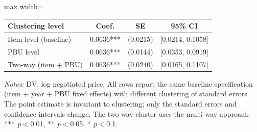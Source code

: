 \begin{adjustbox}{max width=\textwidth}
\begin{threeparttable}
\small
\begin{tabular}{lccc}
\toprule
Clustering level & Coef. & SE & 95\% CI \\
\midrule
Item level (baseline) & 0.0636*** & (0.0215) & [0.0214, 0.1058] \\
PBU level & 0.0636*** & (0.0144) & [0.0353, 0.0919] \\
Two-way (item + PBU) & 0.0636*** & (0.0240) & [0.0165, 0.1107] \\
\bottomrule
\end{tabular}
\begin{tablenotes}
\small
\item \textit{Notes:} DV: log negotiated price. All rows report the same
baseline specification (item + year + PBU fixed effects) with different
clustering of standard errors. The point estimate is invariant to clustering;
only the standard errors and confidence intervals change. The two-way cluster
uses the \citet{cameron2011robust} multi-way approach.
*** \textit{p}$<$0.01, ** \textit{p}$<$0.05, * \textit{p}$<$0.1.
\end{tablenotes}
\end{threeparttable}
\end{adjustbox}
